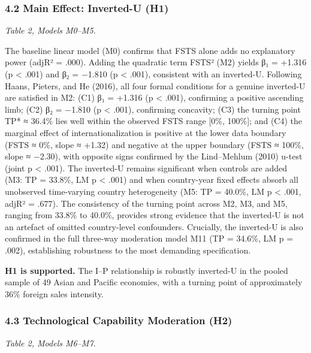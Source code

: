 \documentclass[12pt,a4paper]{article}
\begin{document}
\hypertarget{42-main-effect-inverted-u-h1}{%
\subsubsection{4.2 Main Effect: Inverted-U
(H1)}\label{42-main-effect-inverted-u-h1}}

\emph{Table 2, Models M0--M5.}

The baseline linear model (M0) confirms that FSTS alone adds no
explanatory power (adjR² = .000). Adding the quadratic term FSTS² (M2)
yields β₁ = +1.316 (p \textless{} .001) and β₂ = −1.810 (p \textless{}
.001), consistent with an inverted-U. Following Haans, Pieters, and He
(2016), all four formal conditions for a genuine inverted-U are
satisfied in M2: (C1) β₁ = +1.316 (p \textless{} .001), confirming a
positive ascending limb; (C2) β₂ = −1.810 (p \textless{} .001),
confirming concavity; (C3) the turning point TP* ≈ 36.4\% lies well
within the observed FSTS range {[}0\%, 100\%{]}; and (C4) the marginal
effect of internationalization is positive at the lower data boundary
(FSTS ≈ 0\%, slope ≈ +1.32) and negative at the upper boundary (FSTS ≈
100\%, slope ≈ −2.30), with opposite signs confirmed by the Lind--Mehlum
(2010) u-test (joint p \textless{} .001). The inverted-U remains
significant when controls are added (M3: TP = 33.8\%, LM p \textless{}
.001) and when country-year fixed effects absorb all unobserved
time-varying country heterogeneity (M5: TP = 40.0\%, LM p \textless{}
.001, adjR² = .677). The consistency of the turning point across M2, M3,
and M5, ranging from 33.8\% to 40.0\%, provides strong evidence that the
inverted-U is not an artefact of omitted country-level confounders.
Crucially, the inverted-U is also confirmed in the full three-way
moderation model M11 (TP = 34.6\%, LM p = .002), establishing robustness
to the most demanding specification.

\textbf{H1 is supported.} The I--P relationship is robustly inverted-U
in the pooled sample of 49 Asian and Pacific economies, with a turning
point of approximately 36\% foreign sales intensity.

\hypertarget{43-technological-capability-moderation-h2}{%
\subsubsection{4.3 Technological Capability Moderation
(H2)}\label{43-technological-capability-moderation-h2}}

\emph{Table 2, Models M6--M7.}
\end{document}
